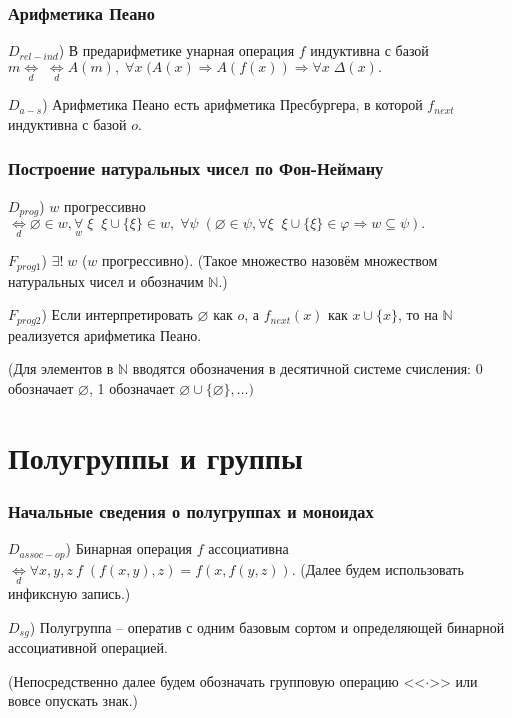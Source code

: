 \documentclass[a4paper]{article}
\newcommand{\Def}[0]{\underset{d}{\Leftrightarrow}}
\begin{document}
\section{Арифметика Пеано}

$D_{rel-ind}$) В  предарифметике унарная операция $f$ индуктивна с базой $m \Def \; \Def A(m),\; \forall x \; (A(x) \Rightarrow A(f(x)) \Rightarrow \forall x \; \Delta(x).$

$D_{a-s}$) Арифметика Пеано есть арифметика Пресбургера, в которой $f_{next}$ индуктивна с базой $o$.

\section{Построение натуральных чисел по Фон-Нейману}

$D_{prog}$) $w$ прогрессивно $\Def \varnothing \in w, \underset{w}{\forall} \; \xi \;\; \xi \cup \{\xi\} \in w, \; \forall \psi \; (\varnothing \in \psi, \forall \xi \;\; \xi \cup \{\xi\} \in \varphi \Rightarrow w \subseteq \psi).$

$F_{prog1}$) $\exists ! \; w$ ($w$ прогрессивно). (Такое множество назовём множеством натуральных чисел и обозначим $\mathbb{N}$.)

$F_{prog2}$) Если интерпретировать $\varnothing$ как $o$, а $f_{next}(x)$ как $x \cup \{x\}$, то на $\mathbb{N}$ реализуется арифметика Пеано.

(Для элементов в $\mathbb{N}$ вводятся обозначения в десятичной системе счисления: 0 обозначает $\varnothing$, 1 обозначает $\varnothing \cup \{\varnothing\}, \dots)$

\clearpage


\part{Полугруппы и группы}

\section{Начальные сведения о полугруппах и моноидах}

$D_{assoc-op}$) Бинарная операция $f$ ассоциативна $\Def \forall x, y, z~f \; (f(x, y), z) = f(x, f(y, z)).$ (Далее будем использовать инфиксную запись.)

$D_{sg}$) Полугруппа -- оператив с одним базовым сортом и определяющей бинарной ассоциативной операцией.

(Непосредственно далее будем обозначать групповую операцию <<$\cdot$>> или вовсе опускать знак.)
\end{document}
